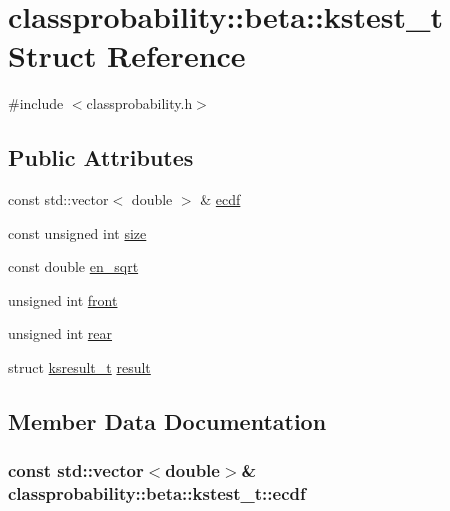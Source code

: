 \hypertarget{structclassprobability_1_1beta_1_1kstest__t}{}\section{classprobability\+:\+:beta\+:\+:kstest\+\_\+t Struct Reference}
\label{structclassprobability_1_1beta_1_1kstest__t}


{\ttfamily \#include $<$classprobability.\+h$>$}

\subsection*{Public Attributes}
\begin{DoxyCompactItemize}
\item 
const std\+::vector$<$ double $>$ \& \hyperlink{structclassprobability_1_1beta_1_1kstest__t_ae89f710edfd69ed3765d81fee325f814}{ecdf}
\item 
const unsigned int \hyperlink{structclassprobability_1_1beta_1_1kstest__t_afa18f1aa40ee1b9d585e38582f4f05b7}{size}
\item 
const double \hyperlink{structclassprobability_1_1beta_1_1kstest__t_a078637ae5995c658270ef9aac4ed9195}{en\+\_\+sqrt}
\item 
unsigned int \hyperlink{structclassprobability_1_1beta_1_1kstest__t_aa7ea111611f5c5bbf2a4f9af6b13a97e}{front}
\item 
unsigned int \hyperlink{structclassprobability_1_1beta_1_1kstest__t_a60fe406e1171ecaa94bb4068eae24108}{rear}
\item 
struct \hyperlink{structclassprobability_1_1beta_1_1ksresult__t}{ksresult\+\_\+t} \hyperlink{structclassprobability_1_1beta_1_1kstest__t_a77acc8e71a848a4e1e7b199054671264}{result}
\end{DoxyCompactItemize}


\subsection{Member Data Documentation}
\subsubsection[{\texorpdfstring{ecdf}{ecdf}}]{\setlength{\rightskip}{0pt plus 5cm}const std\+::vector$<$double$>$\& classprobability\+::beta\+::kstest\+\_\+t\+::ecdf}\hypertarget{structclassprobability_1_1beta_1_1kstest__t_ae89f710edfd69ed3765d81fee325f814}{}\label{structclassprobability_1_1beta_1_1kstest__t_ae89f710edfd69ed3765d81fee325f814}
